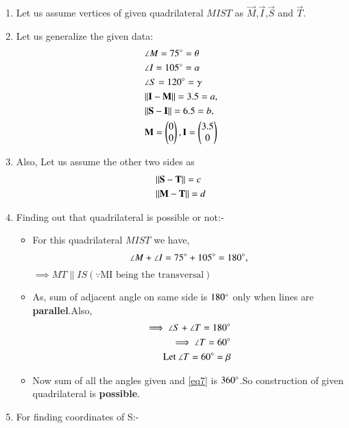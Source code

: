 \documentclass[journal,12pt,twocolumn]{IEEEtran}
\begin{document}
\begin{enumerate}
\item Let us assume vertices of given quadrilateral $MIST$ as $\vec{M}$,$\vec{I}$,$\vec{S}$ and $\vec{T}$.

\item Let us generalize the given data:
    \begin{align}
    &\angle M= 75\degree=\theta \label{eq1}
    \\
    &\angle I= 105\degree=\alpha
    \\
    &\angle S= 120\degree=\gamma \label{eq2}
    \\
    &\Vert\mathbf{I}-\mathbf{M}\rVert =3.5=a, \label{eq3}
    \\
    &\Vert\mathbf{S}-\mathbf{I}\rVert =6.5=b,\label{eq4}
    \\
    &\mathbf{M}=\begin{pmatrix}0\\0\end{pmatrix}, \mathbf{I}=\begin{pmatrix}3.5\\0\end{pmatrix}
    \end{align}
\item Also, Let us assume the other two sides as
\begin{align}
 &\Vert\mathbf{S}-\mathbf{T}\rVert=c \label{eq5}
 \\
  &\Vert\mathbf{M}-\mathbf{T}\rVert =d \label{eq6}
\end{align}  
\item Finding out that quadrilateral is possible or not:-
\begin{itemize}
\item For this quadrilateral $MIST$ we have,
\begin{align}
\angle M +\angle I = 75\degree + 105\degree =180\degree,
\end{align}
$ \implies MT \parallel IS (\because \text {MI being the transversal})$
\\
\item As, sum of adjacent angle on same side is $180\degree$ only when lines are \textbf{parallel}.Also,
\begin{align}
\implies \angle S + \angle T = 180\degree 
\\
\implies \angle T = 60\degree 
\\
\text{Let }\angle T = 60\degree =\beta \label{eq7}
\end{align}
\item Now sum of all the angles given and \eqref{eq7} is $360\degree$.So construction of given quadrilateral is \textbf{possible}.
 \end{itemize}
 \item For finding coordinates of S:-

\end{enumerate}
\end{document}
